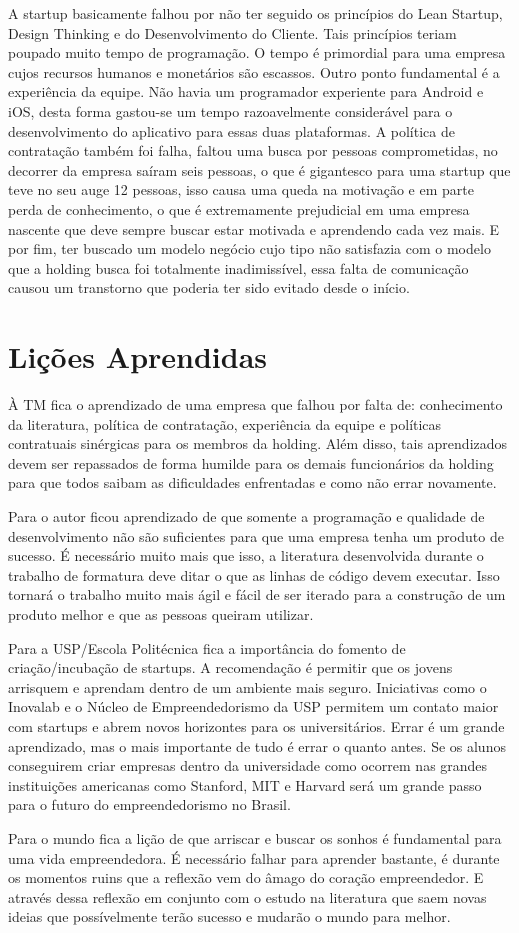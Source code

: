 A startup basicamente falhou por não ter seguido os princípios do Lean Startup, Design Thinking e do Desenvolvimento do Cliente. Tais princípios teriam poupado muito tempo de programação. O tempo é primordial para uma empresa cujos recursos humanos e monetários são escassos. Outro ponto fundamental é a experiência da equipe. Não havia um programador experiente para Android e iOS, desta forma gastou-se um tempo razoavelmente considerável para o desenvolvimento do aplicativo para essas duas plataformas. A política de contratação também foi falha, faltou uma busca por pessoas comprometidas, no decorrer da empresa saíram seis pessoas, o que é gigantesco para uma startup que teve no seu auge 12 pessoas, isso causa uma queda na motivação e em parte perda de conhecimento, o que é extremamente prejudicial em uma empresa nascente que deve sempre buscar estar motivada e aprendendo cada vez mais. E por fim, ter buscado um modelo negócio cujo tipo não satisfazia com o modelo que a holding busca foi totalmente inadimissível, essa falta de comunicação causou um transtorno que poderia ter sido evitado desde o início.

\section{Lições Aprendidas}
\label{sec:licoes_aprendidas}

À TM fica o aprendizado de uma empresa que falhou por falta de: conhecimento da literatura, política de contratação, experiência da equipe e políticas contratuais sinérgicas para os membros da holding. Além disso, tais aprendizados devem ser repassados de forma humilde para os demais funcionários da holding para que todos saibam as dificuldades enfrentadas e como não errar novamente.

Para o autor ficou aprendizado de que somente a programação e qualidade de desenvolvimento não são suficientes para que uma empresa tenha um produto de sucesso. É necessário muito mais que isso, a literatura desenvolvida durante o trabalho de formatura deve ditar o que as linhas de código devem executar. Isso tornará o trabalho muito mais ágil e fácil de ser iterado para a construção de um produto melhor e que as pessoas queiram utilizar.

Para a USP/Escola Politécnica fica a importância do fomento de criação/incubação de startups. A recomendação é permitir que os jovens arrisquem e aprendam dentro de um ambiente mais seguro. Iniciativas como o Inovalab e o Núcleo de Empreendedorismo da USP permitem um contato maior com startups e abrem novos horizontes para os universitários. Errar é um grande aprendizado, mas o mais importante de tudo é errar o quanto antes. Se os alunos conseguirem criar empresas dentro da universidade como ocorrem nas grandes instituições americanas como Stanford, MIT e Harvard será um grande passo para o futuro do empreendedorismo no Brasil.

Para o mundo fica a lição de que arriscar e buscar os sonhos é fundamental para uma vida empreendedora. É necessário falhar para aprender bastante, é durante os momentos ruins que a reflexão vem do âmago do coração empreendedor. E através dessa reflexão em conjunto com o estudo na literatura que saem novas ideias que possívelmente terão sucesso e mudarão o mundo para melhor.
